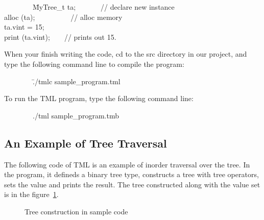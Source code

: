 \documentclass[12pt,psfig,a4]{article}
\begin{document}
\begin{code}
\begin{tabbing}
~~~~~~~~\=MyTree\_t ta;~~~~~~~// declare new instance\\
\> alloc (ta);~~~~~~~~~~// alloc memory\\
\> ta.vint = 15;\\
\> print (ta.vint);~~~~// prints out 15.\\
\end{tabbing}
\end{code}

When your finish writing the code, cd to the src directory in our project, and type the following command line to compile the program:
\begin{code}
\begin{tabbing}
~~~~~~~~\=./tmlc sample\_program.tml
\end{tabbing}
\end{code}
To run the TML program, type the following command line:
\begin{code}
\begin{tabbing}
~~~~~~~~./tml sample\_program.tmb
\end{tabbing}
\end{code}


\subsection {An Example of Tree Traversal}
The following code of TML is an example of inorder traversal over the tree. In the program, it defineds a binary tree type, constructs a tree with tree operators, sets the value and prints the result.
The tree constructed along with the value set is in the figure~\ref{bintree}.

\begin{figure}[h!]
{\centering {} \par}
\caption{Tree construction in sample code}
\label{bintree}
\end{figure}
\end{document}
